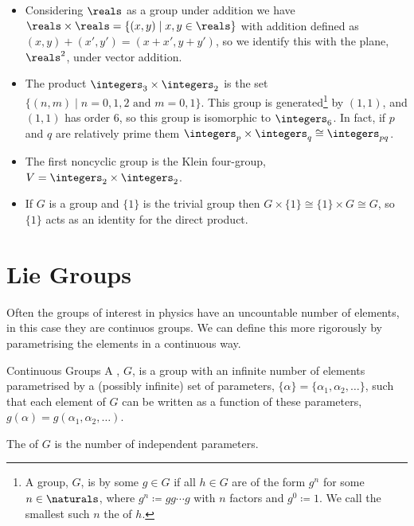 \documentclass[fleqn]{NotesClass}
\newcommand{\cyclicGroupZ}[1][n]{\integers_{#1}}
\newcommand{\isomorphic}{\cong}
\begin{document}
    \begin{exm}{}{}
        \begin{itemize}
            \item Considering \(\reals\) as a group under addition we have \(\reals \times \reals = \{(x, y) \mid x, y \in \reals\}\) with addition defined as \((x, y) + (x', y') = (x + x', y + y')\), so we identify this with the plane, \(\reals^2\), under vector addition.
            \item The product \(\cyclicGroupZ[3] \times \cyclicGroupZ[2]\) is the set \(\{(n, m) \mid n = 0, 1, 2 \text{ and } m = 0, 1\}\).
            This group is generated\footnote{A group, \(G\), is  by some \(g \in G\) if all \(h \in G\) are of the form \(g^n\) for some \(n \in \naturals\), where \(g^n \coloneqq g g \dotsm g\) with \(n\) factors and \(g^0 \coloneqq 1\). We call the smallest such \(n\) the  of \(h\).} by \((1, 1)\), and \((1, 1)\) has order 6, so this group is isomorphic to \(\cyclicGroupZ[6]\).
            In fact, if \(p\) and \(q\) are relatively prime them \(\cyclicGroupZ[p] \times \cyclicGroupZ[q] \isomorphic \cyclicGroupZ[pq]\).
            \item The first noncyclic group is the Klein four-group, \(V = \cyclicGroupZ[2] \times \cyclicGroupZ[2]\).
            \item If \(G\) is a group and \(\{1\}\) is the trivial group then \(G \times \{1\} \isomorphic \{1\} \times G \isomorphic G\), so \(\{1\}\) acts as an identity for the direct product.
        \end{itemize}
    \end{exm}
    
    \section{Lie Groups}
    Often the groups of interest in physics have an uncountable number of elements, in this case they are continuos groups.
    We can define this more rigorously by parametrising the elements in a continuous way.
    \begin{dfn}{Continuous Groups}{}
        A , \(G\), is a group with an infinite number of elements parametrised by a (possibly infinite) set of parameters, \(\{\alpha\} = \{\alpha_1, \alpha_2, \dotsc\}\), such that each element of \(G\) can be written as a function of these parameters, \(g(\alpha) = g(\alpha_1, \alpha_2, \dotsc)\).
        
        The  of \(G\) is the number of independent parameters.
    \end{dfn}
    
\end{document}
